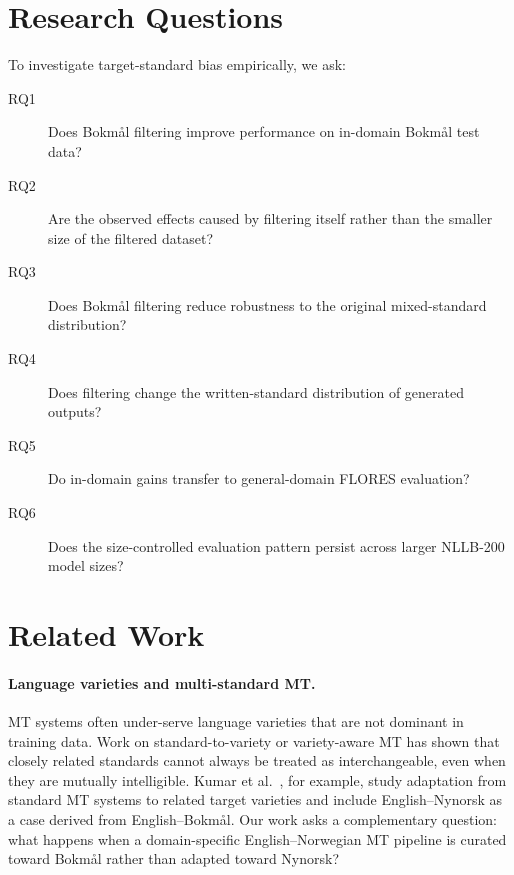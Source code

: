 \documentclass[11pt]{article}
\newcommand{\nb}{Bokm{\aa}l}
\newcommand{\nn}{Nynorsk}
\begin{document}
\section{Research Questions}

To investigate target-standard bias empirically, we ask:

\begin{description}
\item[RQ1] Does \nb{} filtering improve performance on in-domain \nb{} test data?

\item[RQ2] Are the observed effects caused by filtering itself rather than the smaller size of the filtered dataset?

\item[RQ3] Does \nb{} filtering reduce robustness to the original mixed-standard distribution?

\item[RQ4] Does filtering change the written-standard distribution of generated outputs?

\item[RQ5] Do in-domain gains transfer to general-domain FLORES evaluation?

\item[RQ6] Does the size-controlled evaluation pattern persist across larger NLLB-200 model sizes?
\end{description}



\section{Related Work}

\paragraph{Language varieties and multi-standard MT.}
MT systems often under-serve language varieties that are not dominant in training data. Work on standard-to-variety or variety-aware MT has shown that closely related standards cannot always be treated as interchangeable, even when they are mutually intelligible. Kumar et al.~, for example, study adaptation from standard MT systems to related target varieties and include English--\nn{} as a case derived from English--\nb{}. Our work asks a complementary question: what happens when a domain-specific English--Norwegian MT pipeline is curated toward \nb{} rather than adapted toward \nn{}?
\end{document}
